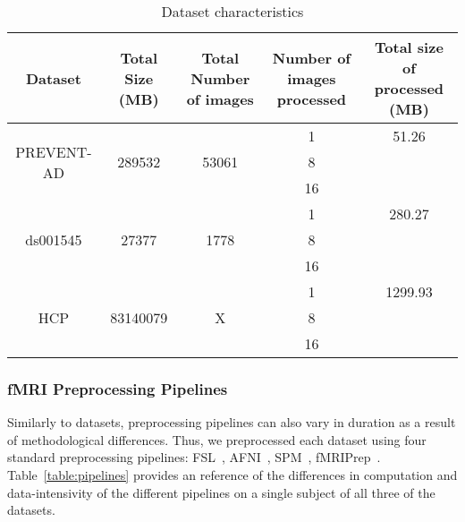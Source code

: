     \begin{table*}[t]
      \small\centering
    \begin{tabular}{|c c c c c|}
      \hline
      Dataset & Total Size (MB) & Total Number of images & Number of images processed & Total size of processed (MB) \\
      \hline
      \multirow{3}{*}{PREVENT-AD} & \multirow{3}{*}{289532} & \multirow{3}{*}{53061} & 1 & 51.26\\
      & & & 8 & \\
      & & & 16 & \\
      \hline
      \multirow{3}{*}{ds001545} & \multirow{3}{*}{27377} & \multirow{3}{*}{1778} & 1 & 280.27\\
      & & & 8 & \\
      & & & 16 & \\
      \hline
      \multirow{3}{*}{HCP} & \multirow{3}{*}{83140079} & \multirow{3}{*}{X} & 1 &  1299.93\\
      & & & 8 & \\
      & & & 16 & \\
    
    
      \hline
    
      \hline
    \end{tabular}\caption{Dataset characteristics}\label{table:data}
    \end{table*}
    
    
    
    \subsubsection{fMRI Preprocessing Pipelines}
    
    Similarly to datasets, preprocessing pipelines can also vary in duration as a result of methodological differences.
    Thus, we preprocessed each dataset using four standard preprocessing pipelines: FSL~\cite{fsl}, AFNI~\cite{AFNI},
    SPM~\cite{spm}, fMRIPrep~\cite{fmriprep}. Table~\ref{table:pipelines} provides an reference of the differences in computation and data-intensivity
    of the different pipelines on a single subject of all three of the datasets.
    
